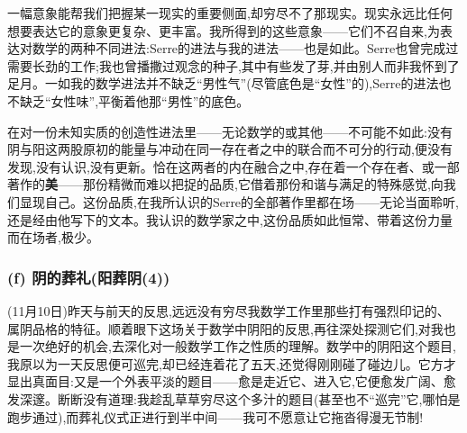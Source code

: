 \dmark{}一幅意象能帮我们把握某一现实的重要侧面,却穷尽不了那现实。现实永远比任何想要表达它的意象更复杂、更丰富。我所得到的这些意象——它们不召自来,为表达对数学的两种不同进法:Serre的进法与我的进法——也是如此。Serre也曾完成过需要长劲的工作;我也曾播撒过观念的种子,其中有些发了芽,并由别人而非我怀到了足月。一如我的数学进法并不缺乏“男性气”(尽管底色是“女性”的),Serre的进法也不缺乏“女性味”,平衡着他那“男性”的底色。

在对一份未知实质的创造性进法里——无论数学的或其他——不可能不如此:没有阴与阳这两股原初的能量与冲动在同一存在者之中的联合而不可分的行动,便没有发现,没有认识,没有更新。恰在这两者的内在融合之中,存在着一个存在者、或一部著作的\textbf{美}——那份精微而难以把捉的品质,它借着那份和谐与满足的特殊感觉,向我们显现自己。这份品质,在我所认识的Serre的全部著作里都在场——无论当面聆听,还是经由他写下的文本。我认识的数学家之中,这份品质如此恒常、带着这份力量而在场者,极少。

\subsubsection*{(f) 阴的葬礼(阳葬阴(4))}
\label{ch18:local:h32}

\label{ch18:local:n28}

(11月10日)昨天与前天的反思,远远没有穷尽我数学工作里那些打有强烈印记的、属阴品格的特征。顺着眼下这场关于数学中阴阳的反思,再往深处探测它们,对我也是一次绝好的机会,去深化对一般数学工作之性质的理解。数学中的阴阳这个题目,我原以为一天反思便可巡完,却已经连着花了五天,还觉得刚刚碰了碰边儿。它方才显出真面目:又是一个外表平淡的题目——愈是走近它、进入它,它便愈发广阔、愈发深邃。断断没有道理:我趁乱草草穷尽这个多汁的题目(甚至也不“巡完”它,哪怕是跑步通过),而葬礼仪式正进行到半中间——我可不愿意让它拖沓得漫无节制!

